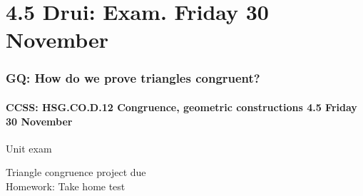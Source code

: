 \documentclass{beamer}
\begin{document}
\section{4.5 Drui: Exam. Friday 30 November}
  \frame
  {
    \frametitle{GQ: How do we prove triangles congruent?}
    \framesubtitle{CCSS: HSG.CO.D.12 Congruence, geometric constructions  \alert{4.5 Friday 30 November}}

    \begin{block}{Unit exam}
    \end{block}
    Triangle congruence project due\\[0.5cm]
    Homework: Take home test
  }
\end{document}
